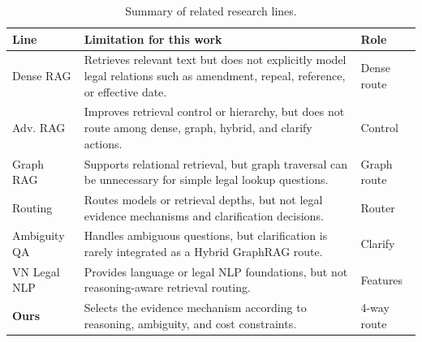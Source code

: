 \documentclass[11pt,twocolumn]{article}
\begin{document}
\begin{table}[!htbp]
\centering
\caption{Summary of related research lines.}
\label{tab:related_comparison_short}
\scriptsize
\setlength{\tabcolsep}{2.5pt}
\renewcommand{\arraystretch}{1.08}
\begin{tabularx}{\columnwidth}{L{1.45cm}Y L{1.35cm}}
\toprule
\textbf{Line} &
\textbf{Limitation for this work} &
\textbf{Role} \\
\midrule

Dense RAG
\cite{lewis2020rag,karpukhin2020dpr,guu2020realm} &
Retrieves relevant text but does not explicitly model legal
relations such as amendment, repeal, reference, or effective
date. &
Dense route \\

Adv. RAG
\cite{asai2023selfrag,jiang2023flare,sarthi2024raptor} &
Improves retrieval control or hierarchy, but does not route
among dense, graph, hybrid, and clarify actions. &
Control \\

Graph RAG
\cite{edge2024graphrag,wang2024kgp,li2024graphreader,
gutierrez2024hipporag} &
Supports relational retrieval, but graph traversal can be
unnecessary for simple legal lookup questions. &
Graph route \\

Routing
\cite{jeong2024adaptive,chen2023frugalgpt,ong2024routellm} &
Routes models or retrieval depths, but not legal evidence
mechanisms and clarification decisions. &
Router \\

Ambiguity QA
\cite{min2020ambigqa,elgohary2019canard} &
Handles ambiguous questions, but clarification is rarely
integrated as a Hybrid GraphRAG route. &
Clarify \\

VN Legal NLP
\cite{nguyen2020phobert,vu2018vncorenlp,chalkidis2020legalbert,
zhong2020nlp_law} &
Provides language or legal NLP foundations, but not
reasoning-aware retrieval routing. &
Features \\

\textbf{Ours} &
Selects the evidence mechanism according to reasoning,
ambiguity, and cost constraints. &
4-way route \\

\bottomrule
\end{tabularx}
\end{table}

\FloatBarrier

\end{document}
